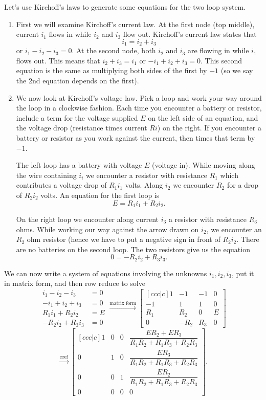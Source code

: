 Let's use Kirchoff's laws to generate some equations for the two loop system. 
\begin{enumerate}
	\item First we will examine Kirchoff's current law. 
	At the first node (top middle), current $i_1$ flows in while $i_2$ and $i_3$ flow out. 
	Kirchoff's current law states that 
	$$i_1=i_2+i_3$$ or $i_1-i_2-i_3=0$.  
	At the second node, both $i_2$ and $i_3$ are flowing in while $i_1$ flows out. 
	This means that $i_2+i_3=i_1$ or $-i_1+i_2+i_3=0$. 
	This second equation is the same as multiplying both sides of the first by $-1$ (so we say the 2nd equation depends on the first). 
	\item We now look at Kirchoff's voltage law. 
	Pick a loop and work your way around the loop in a clockwise fashion. 
	Each time you encounter a battery or resistor, include a term for the voltage supplied $E$ on the left side of an equation, and the voltage drop (resistance times current $Ri$) on the right. 
	If you encounter a battery or resistor as you work against the current, then times that term by $-1$. 
	
	The left loop has a battery with voltage $E$ (voltage in). 
	While moving along the wire containing $i_i$ we encounter a resistor with resistance $R_1$ which contributes a voltage drop of $R_1i_1$ volts. 
	Along $i_2$ we encounter $R_2$ for a drop of $R_2i_2$ volts. An equation for the first loop is 
	$$E=R_1i_1+R_2i_2.$$
	 
	On the right loop we encounter along current $i_3$ a resistor with resistance $R_3$ ohms.  
	While working our way against the arrow drawn on $i_2$, we encounter an $R_2$ ohm resistor (hence we have to put a negative sign in front of $R_2i_2$. 
	There are no batteries on the second loop. The two resistors give us the equation $$0=-R_2 i_2 +R_3i_3.$$ 
\end{enumerate}
We can now write a system of equations involving the unknowns $i_1,i_2,i_3$, put it in matrix form, and then row reduce to solve
$$
\begin{array}{rl}
i_1-i_2-i_3&=0\\
-i_1+i_2+i_3&=0\\
R_1i_1+R_2i_2&=E\\
-R_2 i_2 +R_3i_3&=0
\end{array}
\xrightarrow{\text{matrix form}}
\begin{bmatrix}[ccc|c]
1&-1&-1&0\\
-1&1&1&0\\
R_1&R_2&0&E\\
0&-R_2&R_3&0
\end{bmatrix}
$$$$
\xrightarrow{\text{rref}}
\begin{bmatrix}[ccc|c]
 1 & 0 & 0 & \dfrac{E R_2+ E R_3}{R_1 R_2+R_1 R_3+R_2R_3} \\
 0 & 1 & 0 & \dfrac{E R_3}{R_1 R_2+R_1 R_3+R_2R_3} \\
 0 & 0 & 1 & \dfrac{E R_2}{R_1 R_2+R_1 R_3+R_2R_3} \\
 0 & 0 & 0 & 0
\end{bmatrix}.
$$
